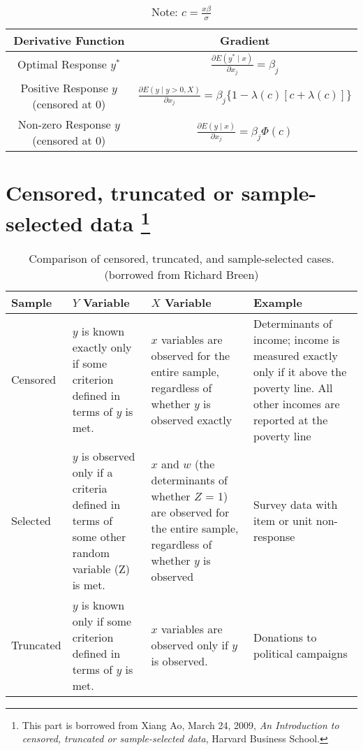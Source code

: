 \begin{table}[H]
    \centering
    \begin{tabular}{|c|c|}
    \hline
    \textbf{Derivative Function} & \textbf{Gradient} \\ \hline
    Optimal Response $y^*$       & $\frac{\partial E(y^* \mid x)}{\partial x_j} = \beta_j$ \\ \hline
    Positive Response $y$ (censored at 0) & $\frac{\partial E(y \mid y>0, X)}{\partial x_j} = \beta_j \{1 - \lambda(c)[c + \lambda(c)]\}$ \\ \hline
    Non-zero Response $y$ (censored at 0) & $\frac{\partial E(y \mid x)}{\partial x_j} = \beta_j \Phi(c)$ \\ \hline
    \end{tabular}
    \caption{Note: $c = \frac{x \beta}{\sigma}$}
\end{table}

\pagebreak
\section{Censored, truncated or sample-selected data \protect\footnote{This part is borrowed from Xiang Ao, March 24, 2009, \textit{An Introduction to censored, truncated or sample-selected data}, Harvard Business School.}}
\begin{table}[H]
    \centering
    \caption{Comparison of censored, truncated, and sample-selected cases. (borrowed from Richard Breen)}
    \begin{tabular}{|>{\raggedright\arraybackslash}m{2cm}|>{\raggedright\arraybackslash}m{4cm}|>{\raggedright\arraybackslash}m{4cm}|>{\raggedright\arraybackslash}m{4cm}|}
    \hline
    \textbf{Sample} & \textbf{$Y$ Variable} & \textbf{$X$ Variable} & \textbf{Example} \\ \hline
    Censored & $y$ is known exactly only if some criterion defined in terms of $y$ is met. & $x$ variables are observed for the entire sample, regardless of whether $y$ is observed exactly & Determinants of income; income is measured exactly only if it above the poverty line. All other incomes are reported at the poverty line \\ \hline
    Selected & $y$ is observed only if a criteria defined in terms of some other random variable (Z) is met. & $x$ and $w$ (the determinants of whether $Z$ = 1) are observed for the entire sample, regardless of whether $y$ is observed & Survey data with item or unit non-response \\ \hline
    Truncated & $y$ is known only if some criterion defined in terms of $y$ is met. & $x$ variables are observed only if $y$ is observed. & Donations to political campaigns \\ \hline
    \end{tabular}
\end{table}

